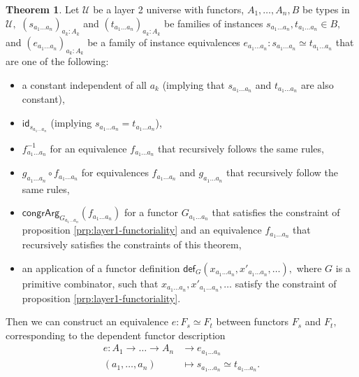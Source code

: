 \documentclass[a4paper]{article}
\theoremstyle{definition}
\newtheorem{theorem}[definition]{Theorem}
\theoremstyle{remark}
\renewcommand{\equiv}{\simeq}
\newcommand{\equivto}{\overset{\equiv}{\rightsquigarrow}}
\newcommand{\U}{\mathcal{U}}
\newcommand{\nm}{\mathsf}
\newcommand{\id}{\nm{id}}
\newcommand{\congrArg}{\nm{congrArg}}
\newcommand{\fndef}[1]{\nm{def}_{#1}}
\begin{document}
\begin{theorem}
  \label{thm:layer2-extensionality}
  Let $\U$ be a layer 2 universe with functors, $A_1,\dots,A_n,B$ be types in $\U,$
  $(s_{a_1 \dots a_n})_{a_k : A_k}$ and $(t_{a_1 \dots a_n})_{a_k : A_k}$ be families
  of instances $s_{a_1 \dots a_n},t_{a_1 \dots a_n} \in B,$ and
  $(e_{a_1 \dots a_n})_{a_k : A_k}$ be a family of instance equivalences
  $e_{a_1 \dots a_n} : s_{a_1 \dots a_n} \equiv t_{a_1 \dots a_n}$ that are one of the
  following:
  \begin{itemize}
    \item a constant independent of all $a_k$ (implying that $s_{a_1 \dots a_n}$ and
    $t_{a_1 \dots a_n}$ are also constant),
    \item $\id_{s_{a_1 \dots a_n}}$ (implying $s_{a_1 \dots a_n} = t_{a_1 \dots a_n}$),
    \item $f_{a_1 \dots a_n}^{-1}$ for an equivalence $f_{a_1 \dots a_n}$ that recursively
    follows the same rules,
    \item $g_{a_1 \dots a_n} \circ f_{a_1 \dots a_n}$ for equivalences $f_{a_1 \dots a_n}$
    and $g_{a_1 \dots a_n}$ that recursively follow the same rules,
    \item $\congrArg_{G_{a_1 \dots a_n}}(f_{a_1 \dots a_n})$ for a functor $G_{a_1 \dots a_n}$ that
    satisfies the constraint of proposition \ref{prp:layer1-functoriality} and an equivalence
    $f_{a_1 \dots a_n}$ that recursively satisfies the constraints of this theorem,
    \item an application of a functor definition
    $\fndef{G}(x_{a_1 \dots a_n},x'_{a_1 \dots a_n},\dots),$ where $G$ is a primitive combinator,
    such that $x_{a_1 \dots a_n},x'_{a_1 \dots a_n},\dots$ satisfy the constraint of proposition
    \ref{prp:layer1-functoriality}.
  \end{itemize}

  Then we can construct an equivalence $e : F_s \equiv F_t$ between functors $F_s$ and $F_t,$
  corresponding to the dependent functor description
  \begin{align*}
    e : A_1 \to \dots \to A_n &\to     e_{a_1 \dots a_n}\\
        (a_1,\dots,a_n)       &\mapsto s_{a_1 \dots a_n} \equiv t_{a_1 \dots a_n}.
  \end{align*}
\end{theorem}
\end{document}
